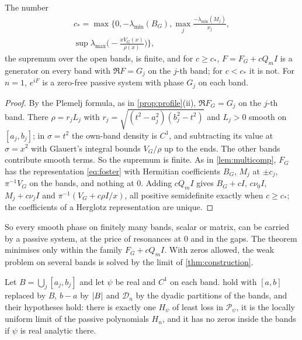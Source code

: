 \begin{theorem}\label{thm:multiband}
The number
\begin{multline*}
c_*=\max\Big\{0,-\lambda_{\min}(B_G),\max_j\frac{-\lambda_{\min}(M_j)}{\nu_j},\\
\sup\lambda_{\max}\Big(-\frac{xV_G(x)}{\rho(x)}\Big)\Big\},
\end{multline*}
the supremum over the open bands, is finite, and for $c\ge c_*$,
$F=F_G+cQ_mI$ is a generator on every band with $\Re F=G_j$ on the $j$-th
band; for $c<c_*$ it is not. For $n=1$, $e^{iF}$ is a zero-free passive
system with phase $G_j$ on each band.
\end{theorem}

\begin{proof}
By the Plemelj formula, as in \cref{prop:profile}(ii), $\Re F_G=G_j$ on the
$j$-th band. There $\rho=r_jL_j$ with
$r_j=\sqrt{(t^2-a_j^2)(b_j^2-t^2)}$ and $L_j>0$ smooth on $[a_j,b_j]$; in
$\sigma=t^2$ the own-band density is $C^1$, and subtracting its value at
$\sigma=x^2$ with Glauert's integral bounds $V_G/\rho$ up to the ends. The
other bands contribute smooth terms. So the supremum is finite. As in
\cref{lem:multicomp}, $F_G$ has the representation \eqref{eq:foster} with
Hermitian coefficients $B_G$, $M_j$ at $\pm c_j$, $\pi^{-1}V_G$ on the bands,
and nothing at $0$. Adding $cQ_mI$ gives $B_G+cI$, $c\nu_0I$, $M_j+c\nu_jI$
and $\pi^{-1}(V_G+c\rho I/x)$, all positive semidefinite exactly when
$c\ge c_*$; the coefficients of a Herglotz representation are unique.
\end{proof}

So every smooth phase on finitely many bands, scalar or matrix, can be
carried by a passive system, at the price of resonances at $0$ and in the
gaps. The theorem minimises only within the family $F_G+cQ_mI$. With zeros
allowed, the weak problem on several bands is solved by the limit of
\cref{thm:construction}.

\begin{corollary}\label{cor:allbands}
Let $B=\bigcup_j[a_j,b_j]$ and let $\psi$ be real and $C^1$ on each band.
 hold with $[a,b]$ replaced
by $B$, $b-a$ by $\left|B\right|$ and $\mathcal D_n$ by the dyadic partitions of the
bands, and their hypotheses hold: there is exactly one $H_\psi$ of least
loss in $\mathcal P_\psi$, it is the locally uniform limit of the passive
polynomials $H_n$, and it has no zeros inside the bands if $\psi$ is real
analytic there.
\end{corollary}

